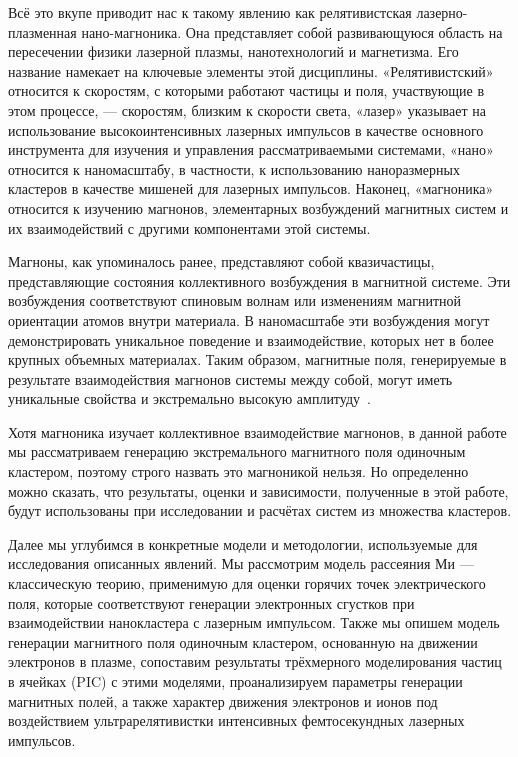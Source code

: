 Всё это вкупе приводит нас к такому явлению как релятивистская лазерно-плазменная нано-магноника. Она представляет собой развивающуюся область на пересечении физики лазерной плазмы, нанотехнологий и магнетизма. Его название намекает на ключевые элементы этой дисциплины. «Релятивистский» относится к скоростям, с которыми работают частицы и поля, участвующие в этом процессе, — скоростям, близким к скорости света, «лазер» указывает на использование высокоинтенсивных лазерных импульсов в качестве основного инструмента для изучения и управления рассматриваемыми системами, «нано» относится к наномасштабу, в частности, к использованию наноразмерных кластеров в качестве мишеней для лазерных импульсов. Наконец, «магноника» относится к изучению магнонов, элементарных возбуждений магнитных систем и их взаимодействий с другими компонентами этой системы.

Магноны, как упоминалось ранее, представляют собой квазичастицы, представляющие состояния коллективного возбуждения в магнитной системе. Эти возбуждения соответствуют спиновым волнам или изменениям магнитной ориентации атомов внутри материала. В наномасштабе эти возбуждения могут демонстрировать уникальное поведение и взаимодействие, которых нет в более крупных объемных материалах. Таким образом, магнитные поля, генерируемые в результате взаимодействия магнонов системы между собой, могут иметь уникальные свойства и экстремально высокую амплитуду~\cite{andreev2021generationmd}. 

Хотя магноника изучает коллективное взаимодействие магнонов, в данной работе мы рассматриваем генерацию экстремального магнитного поля одиночным кластером, поэтому строго назвать это магноникой нельзя. Но определенно можно сказать, что результаты, оценки и зависимости, полученные в этой работе, будут использованы при исследовании и расчётах систем из множества кластеров.

Далее мы углубимся в конкретные модели и методологии, используемые для исследования описанных явлений. Мы рассмотрим модель рассеяния Ми ---  классическую теорию, применимую для оценки горячих точек электрического поля, которые соответствуют генерации электронных сгустков при взаимодействии нанокластера с лазерным импульсом. Также мы опишем модель генерации магнитного поля одиночным кластером, основанную на движении электронов в плазме, сопоставим результаты трёхмерного моделирования частиц в ячейках (PIC) с этими моделями, проанализируем параметры генерации магнитных полей, а также характер движения электронов и ионов под воздействием ультрарелятивистки интенсивных фемтосекундных лазерных импульсов.